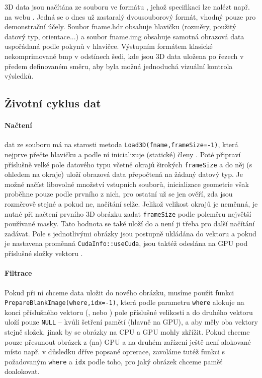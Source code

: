         3D data jsou načítána ze souboru ve formátu \Analyze, jehož specifikaci lze nalézt např. na webu \cite{Analyze 7.5}. Jedná se o dnes už zastaralý dvousouborový formát, vhodný pouze pro demonstrační účely. Soubor fname.hdr obsahuje hlavičku (rozměry, použitý datový typ, orientace...) a soubor fname.img obsahuje samotná obrazová data uspořádaná podle pokynů v hlavičce. Výstupním formátem klasické nekomprimované bmp v odstínech šedi, kde jsou 3D data uložena po řezech v předem definovaném směru, aby byla možná jednoduchá vizuální kontrola výsledků.

        \subsection{Životní cyklus dat}

        \paragraph{Načtení} dat ze souboru má na starosti metoda {\tt Load3D(fname,frameSize=-1)}, která nejprve přečte hlavičku a podle ní inicializuje (statické) členy \Imageinfo. Poté připraví příslušně velké pole datového typu \imDataType  včetně okrajů širokých {\tt frameSize} a do něj (s ohledem na okraje) uloží obrazová data přepočtená na žádaný datový typ. Je možné načíst libovolné množství vstupních souborů, inicializace geometrie však proběhne pouze podle prvního z nich, pro ostatní už se jen ověří, zda jsou rozměrově stejné a pokud ne, načítání selže. Jelikož velikost okrajů je neměnná, je nutné při načtení prvního 3D obrázku zadat {\tt frameSize} podle poleměru největší používané masky. Tato hodnota se také uloží do \Imageinfo  a není ji třeba pro další načítání zadávat. Pole s jednotlivými obrázky jsou postupně ukládána do vektoru \image  a pokud je nastavena proměnná {\tt CudaInfo::useCuda}, jsou taktéž odeslána na GPU pod příslušné složky vektoru \imageGpu.

        \paragraph{Filtrace}Pokud při ní chceme data uložit do nového obrázku, musíme použít funkci {\tt PrepareBlankImage(where,idx=-1)}, která podle parametru {\tt where} alokuje na konci příslušného vektoru (\image, nebo \imageGpu) pole příslušné velikosti a do druhého vektoru uloží pouze {\tt NULL} -- kvůli šetření pamětí (hlavně na GPU), a aby měly oba vektory stejně složek, jinak by se obrázky na CPU a GPU mohly zkřížit. Pokud chceme pouze přesunout obrázek z (na) GPU a na druhém zařízení ještě není alokované místo např. v důsledku dříve popsané oprerace, zavoláme tutéž funkci s požadovaným {\tt where} a {\tt idx} podle toho, pro jaký obrázek chceme paměť doalokovat.

